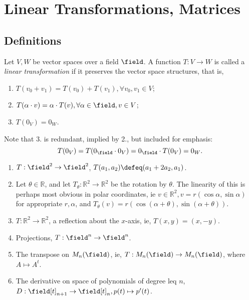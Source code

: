 \section{Linear Transformations, Matrices}
\subsection{Definitions}
\begin{definition}
    Let $V, W$ be vector spaces over a field $\field$. A function $T: V \to W$ is called a \emph{linear transformation} if it preserves the vector space structures, that is, \begin{enumerate}
        \item $T(v_0 + v_1) = T(v_0) + T(v_1), \forall v_0, v_1 \in V$;
        \item $T(\alpha \cdot v) = \alpha \cdot T(v), \forall \alpha \in \field, v \in V$;
        \item $T(0_V) = 0_W$.
    \end{enumerate}
\end{definition}

\begin{remark}
    Note that 3. is redundant, implied by 2., but included for emphasis:
    \[
    T(0_V) = T(0_\field \cdot 0_V) = 0_\field \cdot T(0_V) = 0_W.    
    \]
\end{remark}

\begin{example}
    \begin{enumerate}
        \item $T: \field^2 \to \field^2$, $T(a_1, a_2) \defeq (a_1 + 2 a_2, a_1)$.
        \item Let $\theta \in \mathbb{R}$, and let $T_\theta : \mathbb{R}^2 \to \mathbb{R}^2$ be the rotation by $\theta$. The linearity of this is perhaps most obvious in polar coordinates, ie $v \in \mathbb{R}^2, v = r (\cos \alpha, \sin \alpha)$ for appropriate $r, \alpha$, and $T_\theta(v) = r (\cos (\alpha + \theta), \sin (\alpha + \theta))$.
        \item $T: \mathbb{R}^2 \to \mathbb{R}^2$, a reflection about the $x$-axis, ie, $T(x, y) = (x, -y)$.
        \item Projections, $T : \field^n \to \field^n$.
        \item The transpose on $M_n(\field)$, ie, $T: M_n(\field) \to M_n (\field)$, where $A \mapsto A^t$.
        \item The derivative on space of polynomials of degree leq $n$, $D : \field[t]_{n+1} \to \field[t]_{n}, p(t) \mapsto p'(t)$.
    \end{enumerate}
\end{example}

